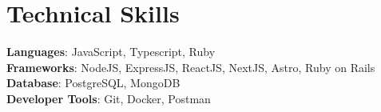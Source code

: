 
\section{{\textcolor{mainHeading}{Technical Skills}}}
 \begin{itemize}[leftmargin=0.15in, label={}]
    \small{\item{
    
     \textbf{Languages}{: JavaScript, Typescript, Ruby} \\

     \textbf{Frameworks}{: NodeJS, ExpressJS, ReactJS, NextJS, Astro, Ruby on Rails} \\
     
     \textbf{Database}{: PostgreSQL, MongoDB} \\
     
     \textbf{Developer Tools}{: Git, Docker, Postman} \\
     
    }}
 \end{itemize}